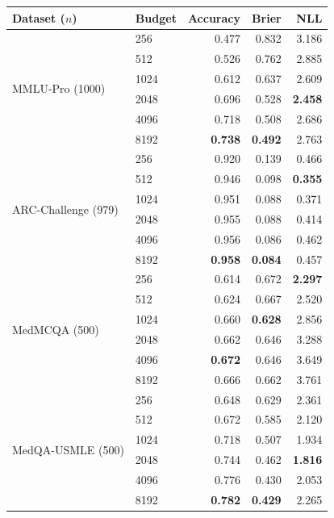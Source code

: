 \documentclass[a4paper,fleqn]{cas-sc}
\theoremstyle{plain}
\theoremstyle{definition}
\theoremstyle{remark}
\begin{document}
\begin{center}
\begin{tabular}{@{}llrrr@{}}
\toprule
Dataset ($n$) & Budget & Accuracy & Brier & NLL \\
\midrule
\multirow{6}{*}{MMLU-Pro (1000)}
 & 256  & 0.477 & 0.832 & 3.186 \\
 & 512  & 0.526 & 0.762 & 2.885 \\
 & 1024 & 0.612 & 0.637 & 2.609 \\
 & 2048 & 0.696 & 0.528 & \textbf{2.458} \\
 & 4096 & 0.718 & 0.508 & 2.686 \\
 & 8192 & \textbf{0.738} & \textbf{0.492} & 2.763 \\
\midrule
\multirow{6}{*}{ARC-Challenge (979)}
 & 256  & 0.920 & 0.139 & 0.466 \\
 & 512  & 0.946 & 0.098 & \textbf{0.355} \\
 & 1024 & 0.951 & 0.088 & 0.371 \\
 & 2048 & 0.955 & 0.088 & 0.414 \\
 & 4096 & 0.956 & 0.086 & 0.462 \\
 & 8192 & \textbf{0.958} & \textbf{0.084} & 0.457 \\
\midrule
\multirow{6}{*}{MedMCQA (500)}
 & 256  & 0.614 & 0.672 & \textbf{2.297} \\
 & 512  & 0.624 & 0.667 & 2.520 \\
 & 1024 & 0.660 & \textbf{0.628} & 2.856 \\
 & 2048 & 0.662 & 0.646 & 3.288 \\
 & 4096 & \textbf{0.672} & 0.646 & 3.649 \\
 & 8192 & 0.666 & 0.662 & 3.761 \\
\midrule
\multirow{6}{*}{MedQA-USMLE (500)}
 & 256  & 0.648 & 0.629 & 2.361 \\
 & 512  & 0.672 & 0.585 & 2.120 \\
 & 1024 & 0.718 & 0.507 & 1.934 \\
 & 2048 & 0.744 & 0.462 & \textbf{1.816} \\
 & 4096 & 0.776 & 0.430 & 2.053 \\
 & 8192 & \textbf{0.782} & \textbf{0.429} & 2.265 \\
\bottomrule
\end{tabular}
\end{center}
\begingroup
{}
\label{tab:budget-audit}
\endgroup
\vspace{\baselineskip}
\end{document}
